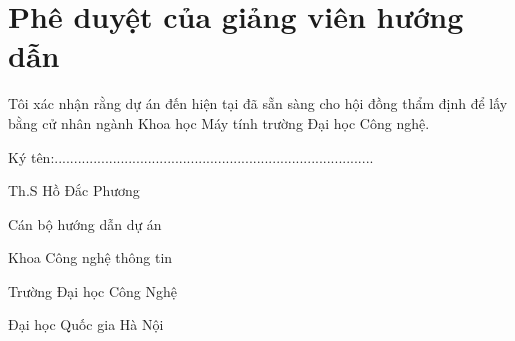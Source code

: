 \chapter*{Phê duyệt của giảng viên hướng dẫn}

Tôi xác nhận rằng dự án đến hiện tại đã sẵn sàng cho hội đồng thẩm định để lấy bằng cử nhân ngành Khoa học Máy tính trường Đại học Công nghệ.\\

\begin{flushright}
Ký tên:..................................................................................

Th.S Hồ Đắc Phương

Cán bộ hướng dẫn dự án

Khoa Công nghệ thông tin

Trường Đại học Công Nghệ

Đại học Quốc gia Hà Nội
\end{flushright}
